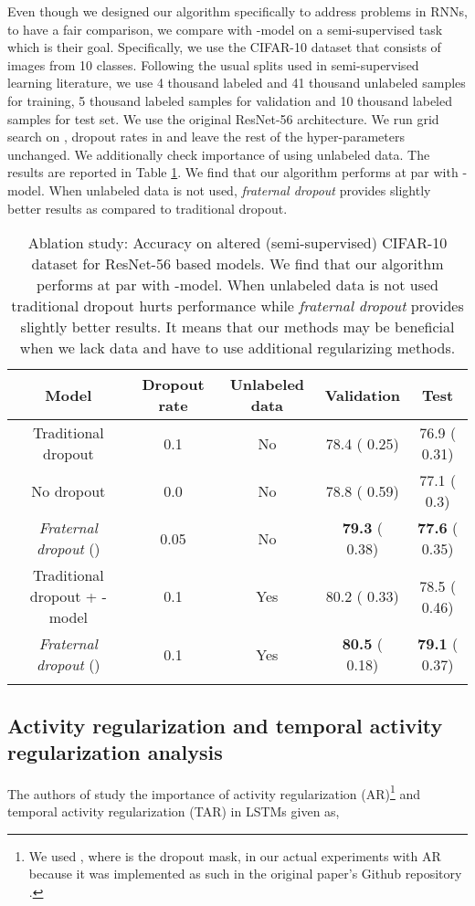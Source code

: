 \documentclass{article} \usepackage{iclr2018_conference,times}
\begin{document}
Even though we designed our algorithm specifically to address problems in RNNs, to have a fair comparison, we compare with -model on a semi-supervised task which is their goal. Specifically, we use the CIFAR-10 dataset that consists of  images from 10 classes. Following the usual splits used in semi-supervised learning literature, we use 4 thousand labeled and 41 thousand unlabeled samples for training, 5 thousand labeled samples for validation and 10 thousand labeled samples for test set. We use the original ResNet-56 \citep{DBLP:journals/corr/HeZRS15} architecture. We run grid search on , dropout rates in  and leave the rest of the hyper-parameters unchanged. We additionally check importance of using unlabeled data. The results are reported in Table \ref{table:CIFAR-10}. We find that our algorithm performs at par with -model. When unlabeled data is not used, \emph{fraternal dropout} provides slightly better results as compared to traditional dropout.

\begin{table}[t]
\vspace{-0.08cm}
\centering
\begin{tabular}{c | c c c c} 
\textbf{Model} & \textbf{Dropout rate} & \textbf{Unlabeled data} & \textbf{Validation} & \textbf{Test}\\
\hline
Traditional dropout & 0.1 & No & 78.4 ( 0.25) & 76.9 ( 0.31)\\
No dropout & 0.0 & No & 78.8 ( 0.59) & 77.1 ( 0.3)\\
\emph{Fraternal dropout} ()& 0.05 & No &  \textbf{79.3} ( 0.38) & \textbf{77.6} ( 0.35)\\
\hline
Traditional dropout + -model & 0.1 & Yes & 80.2 ( 0.33) & 78.5 ( 0.46)\\
\emph{Fraternal dropout} () & 0.1 & Yes & \textbf{80.5} ( 0.18) & \textbf{79.1} ( 0.37)\\
\vspace{-0.08cm}
\end{tabular}
\caption{Ablation study: Accuracy on altered (semi-supervised) CIFAR-10 dataset for ResNet-56 based models. We find that our algorithm performs at par with -model. When unlabeled data is not used traditional dropout hurts performance while \emph{fraternal dropout} provides slightly better results. It means that our methods may be beneficial when we lack data and have to use additional regularizing methods.}
\label{table:CIFAR-10}
\end{table}

\subsection{Activity regularization and temporal activity regularization analysis} \label{subsec:ar_tar}
The authors of \cite{ar_tar} study the importance of activity regularization (AR)\footnote{We used , where  is the dropout mask, in our actual experiments with AR because it was implemented as such in the original paper's Github repository \cite{merity2017regularizing}.} and temporal activity regularization (TAR) in LSTMs given as,
\end{document}
